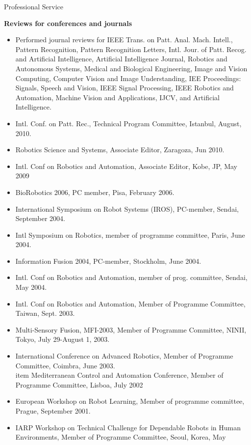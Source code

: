 \documentclass{article}
\begin{document}
\begin{cv}
\begin{cvlist}{Professional Service}
\item {\bf Reviews for conferences and journals}
  \begin{itemize}
  \item Performed journal reviews for IEEE Trans.  on Patt.  Anal.
    Mach.  Intell., Pattern Recognition, Pattern Recognition Letters,
    Intl.  Jour.  of Patt.  Recog.  and Artificial Intelligence,
    Artificial Intelligence Journal, Robotics and Autonomous Systems,
    Medical and Biological Engineering, Image and Vision Computing,
    Computer Vision and Image Understanding, IEE Proceedings: Signals,
    Speech and Vision, IEEE Signal Processing, IEEE Robotics and
    Automation, Machine Vision and Applications, IJCV, and Artificial
    Intelligence.
  \item Intl. Conf. on Patt. Rec., Technical Program Committee,
    Istanbul, August, 2010.
  \item Robotics Science and Systems, Associate Editor, Zaragoza, Jun
    2010.
  \item Intl. Conf on Robotics and Automation, Associate Editor, Kobe,
    JP, May 2009
  \item BioRobotics 2006, PC member, Pisa, February 2006.
  \item International Symposium on Robot Systems (IROS), PC-member, Sendai,
    September 2004.
  \item Intl Symposium on Robotics, member of programme committee,
    Paris, June 2004.
  \item Information Fusion 2004, PC-member, Stockholm, June 2004.
  \item Intl. Conf on Robotics and Automation, member of
    prog. committee, Sendai, May 2004.
  \item Intl. Conf on Robotics and Automation, Member of Programme
    Committee, Taiwan, Sept. 2003.
  \item Multi-Sensory Fusion, MFI-2003, Member of Programme Committee,
    NINII, Tokyo, July 29-August 1, 2003.
  \item International Conference on Advanced Robotics, Member of
    Programme Committee, Coimbra, June 2003.
    \\item Mediterranean Control and Automation Conference, Member of
    Programme Committee, Lisboa, July 2002
  \item European Workshop on Robot Learning, Member of programme
    committee, Prague, September 2001.
  \item IARP Workshop on Technical Challenge for Dependable Robots in
    Human Environments, Member of Programme Committee, Seoul, Korea, May

\end{itemize}
\end{cvlist}
\end{cv}
\end{document}
